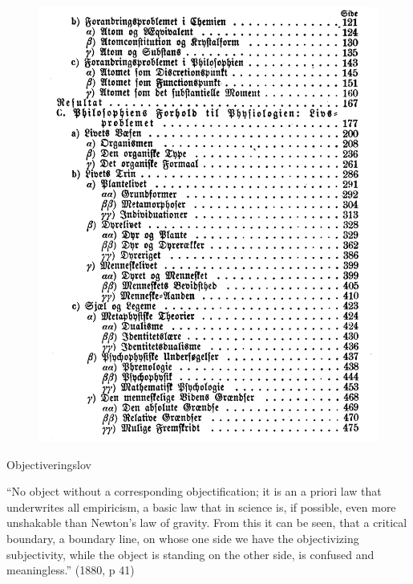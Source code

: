 \documentclass[ignorenonframetext, ]{beamer}
\begin{document}
\begin{frame}

\begin{figure}
\centering
\includegraphics[scale=0.5]{prop3.jpg}

\end{figure}
\end{frame}



\begin{frame}{Objectiveringslov}

  ``No object without a corresponding objectification; it is an a
  priori law that underwrites all empiricism, a basic law that in
  science is, if possible, even more unshakable than Newton's law of
  gravity. From this it can be seen, that a critical boundary, a
  boundary line, on whose one side we have the objectivizing
  subjectivity, while the object is standing on the other side, is
  confused and meaningless.'' (1880, p 41)

\end{frame}
\end{document}
